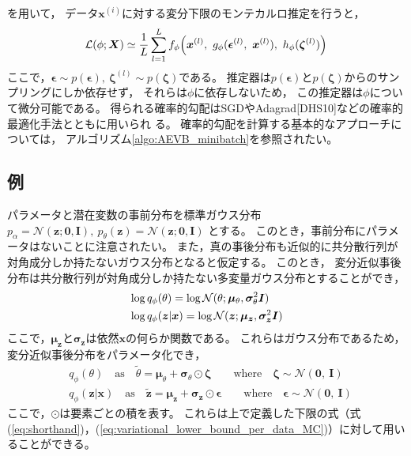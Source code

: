 \documentclass[dvipdfmx, fleqn, draft]{jsarticle}
\begin{document}
を用いて，
データ\(\bm{x}^{(i)}\)に対する変分下限のモンテカルロ推定を行うと，
\begin{equation}
    \mathcal{L}(\phi; \bm{X}) \simeq \frac{1}{L} \sum_{l=1}^{L} f_{\phi} \qty(\bm{x}^{(l)},\ g_{\phi} (\bm{\epsilon}^{(l)},\ \bm{x}^{(l)}),\ h_{\phi} (\bm{\zeta}^{(l)}))
    \label{eq:variational_lower_bound_per_data_MC}
\end{equation}
ここで，\(\bm{\epsilon} \sim p(\bm{\epsilon}),\ \bm{\zeta}^{(l)} \sim p(\bm{\zeta})\)である。
推定器は\(p(\bm{\epsilon})\)と\(p(\bm{\zeta})\)からのサンプリングにしか依存せず，
それらは\(\phi\)に依存しないため，
この推定器は\(\phi\)について微分可能である。
得られる確率的勾配はSGDやAdagrad[DHS10]などの確率的最適化手法とともに用いられ
る。
確率的勾配を計算する基本的なアプローチについては，
アルゴリズム\ref{algo:AEVB_minibatch}を参照されたい。


\subsection{例}

パラメータと潜在変数の事前分布を標準ガウス分布
\(p_{\alpha} = \mathcal{N}(\bm{z}; \bm{0}, \bm{I}),\ p_{\theta} (\bm{z}) = \mathcal{N}(\bm{z}; \bm{0}, \bm{I})\)
とする。
このとき，事前分布にパラメータはないことに注意されたい。
また，真の事後分布も近似的に共分散行列が対角成分しか持たないガウス分布となると仮定する。
このとき，
変分近似事後分布は共分散行列が対角成分しか持たない多変量ガウス分布とすることができ，
\begin{align}
    & \log{q_{\phi} (\theta)} = \log{\mathcal{N}(\theta; \bm{\mu}_{\theta}, \bm{\sigma}_{\theta}^2 \bm{I})} \notag \\
    & \log{q_{\phi} (\bm{z} | \bm{x})} = \log{\mathcal{N}(\bm{z}; \bm{\mu}_{\bm{z}}, \bm{\sigma}_{\bm{z}}^2 \bm{I})}
\end{align}
ここで，\(\bm{\mu}_{\bm{z}}\)と\(\bm{\sigma}_{\bm{z}}\)は依然\(\bm{x}\)の何らか関数である。
これらはガウス分布であるため，
変分近似事後分布をパラメータ化でき，
\begin{align*}
    & q_{\phi} (\theta)
        \quad \text{as} \quad
        \tilde{\theta} = \bm{\mu}_{\theta} + \bm{\sigma}_{\theta} \odot \bm{\zeta}
        \qquad \text{where} \quad
        \bm{\zeta} \sim \mathcal{N}(\bm{0},\ \bm{I}) \\
    & q_{\phi} (\bm{z} | \bm{x})
        \quad \text{as} \quad
        \tilde{\bm{z}} = \bm{\mu}_{\bm{z}} + \bm{\sigma}_{\bm{z}} \odot \bm{\epsilon}
        \qquad \text{where} \quad
        \bm{\epsilon} \sim \mathcal{N}(\bm{0},\ \bm{I})
\end{align*}
ここで，\(\odot\)は要素ごとの積を表す。
これらは上で定義した下限の式（式(\ref{eq:shorthand})，(\ref{eq:variational_lower_bound_per_data_MC})）に対して用いることができる。
\end{document}
